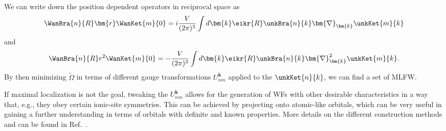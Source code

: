 We can write down the position dependent operators in reciprocal space as\cite{Blount1962}
\begin{equation}
\WanBra{n}{R}\bm{r}\WanKet{m}{0} = i \frac{V}{(2\pi)^3}\int d\bm{k} \eikr{R}\unkBra{n}{k} \bm{\nabla}_{\bm{k}} \unkKet{m}{k}
\end{equation}
and
\begin{equation}
\WanBra{n}{R}r^2\WanKet{m}{0} = -\frac{V}{(2\pi)^3}\int d\bm{k} \eikr{R}\unkBra{n}{k} \bm{\nabla}_{\bm{k}}^2 \unkKet{m}{k}.
\end{equation}
By then minimizing $\tilde\Omega$ in terms of different gauge transformations $U_{nm}^{\bm{k}}$ applied to the $\unkKet{n}{k}$, we can find a set of MLFW. 

If maximal localization is not the goal, tweaking the $U_{nm}^{\bm{k}}$ allows for the generation of WFs with other desirable characteristics in a way that, e.g., they obey certain ionic-site symmetries.
This can be achieved by projecting onto atomic-like orbitals, which can be very useful in gaining a further understanding in terms of orbitals with definite and known properties.
More details on the different construction methods and can be found in Ref.~\cite{Marzari2012}.

